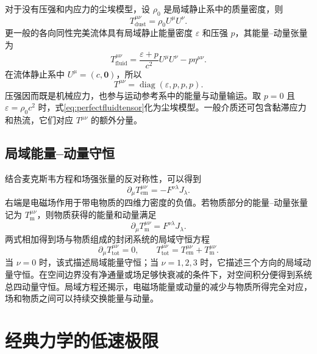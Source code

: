 \documentclass[style=classic,color=full]{lc-article}
\begin{document}
对于没有压强和内应力的尘埃模型，设 $\rho_0$ 是局域静止系中的质量密度，则
\begin{equation}
  T_{\mathrm{dust}}^{\mu\nu}
  =\rho_0 U^\mu U^\nu.
  \label{eq:dusttensor}
\end{equation}
更一般的各向同性完美流体具有局域静止能量密度 $\varepsilon$ 和压强 $p$，其能量--动量张量为
\begin{equation}
  \boxed{
  T_{\mathrm{fluid}}^{\mu\nu}
  =\frac{\varepsilon+p}{c^2}U^\mu U^\nu
  -p\eta^{\mu\nu}.}
  \label{eq:perfectfluidtensor}
\end{equation}
在流体静止系中 $U^\mu=(c,\bm0)$，所以
\begin{equation}
  T^{\mu\nu}=\operatorname{diag}(\varepsilon,p,p,p).
\end{equation}
压强因而既是机械应力，也参与运动参考系中的能量与动量输运。取 $p=0$ 且 $\varepsilon=\rho_0c^2$ 时，式\eqref{eq:perfectfluidtensor}化为尘埃模型。一般介质还可包含黏滞应力和热流，它们对应 $T^{\mu\nu}$ 的额外分量\cite{landau}。

\subsection{局域能量--动量守恒}

结合麦克斯韦方程和场强张量的反对称性，可以得到
\begin{equation}
  \partial_\mu T_{\mathrm{em}}^{\mu\nu}
  =-F^{\nu\lambda}J_\lambda.
  \label{eq:emlocalbalance}
\end{equation}
右端是电磁场作用于带电物质的四维力密度的负值。若物质部分的能量--动量张量记为 $T_{\mathrm m}^{\mu\nu}$，则物质获得的能量和动量满足
\begin{equation}
  \partial_\mu T_{\mathrm m}^{\mu\nu}
  =F^{\nu\lambda}J_\lambda.
  \label{eq:matterlocalbalance}
\end{equation}
两式相加得到场与物质组成的封闭系统的局域守恒方程
\begin{equation}
  \boxed{
  \partial_\mu T_{\mathrm{tot}}^{\mu\nu}=0,
  \qquad
  T_{\mathrm{tot}}^{\mu\nu}
  =T_{\mathrm{em}}^{\mu\nu}+T_{\mathrm m}^{\mu\nu}.}
  \label{eq:localenergymomentumconservation}
\end{equation}
当 $\nu=0$ 时，该式描述局域能量守恒；当 $\nu=1,2,3$ 时，它描述三个方向的局域动量守恒。在空间边界没有净通量或场足够快衰减的条件下，对空间积分便得到系统总四动量守恒。局域方程还揭示，电磁场能量或动量的减少与物质所得完全对应，场和物质之间可以持续交换能量与动量\cite{landau,griffiths}。

\section{经典力学的低速极限}
\end{document}
